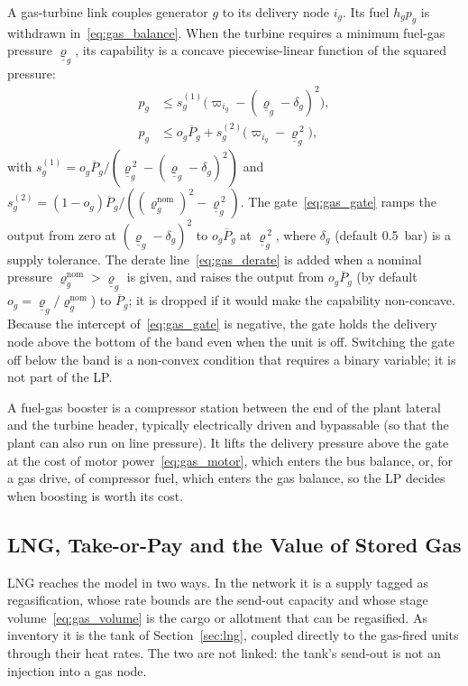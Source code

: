 A gas-turbine link couples generator $g$ to its delivery node $i_g$.
Its fuel $h_g p_g$ is withdrawn in~\eqref{eq:gas_balance}.  When the
turbine requires a minimum fuel-gas pressure $\underline{\varrho}_g$,
its capability is a concave piecewise-linear function of the squared
pressure:
\begin{align}
p_g &\leq s^{(1)}_g\bigl(\varpi_{i_g}
  - (\underline{\varrho}_g - \delta_g)^2\bigr),
  \label{eq:gas_gate} \\
p_g &\leq o_g\overline{P}_g
  + s^{(2)}_g\bigl(\varpi_{i_g} - \underline{\varrho}_g^{\,2}\bigr),
  \label{eq:gas_derate}
\end{align}
with $s^{(1)}_g = o_g\overline{P}_g/(\underline{\varrho}_g^{\,2}
- (\underline{\varrho}_g - \delta_g)^2)$ and
$s^{(2)}_g = (1 - o_g)\overline{P}_g/((\varrho^{\mathrm{nom}}_g)^2
- \underline{\varrho}_g^{\,2})$.  The gate~\eqref{eq:gas_gate} ramps the
output from zero at $(\underline{\varrho}_g - \delta_g)^2$ to
$o_g\overline{P}_g$ at $\underline{\varrho}_g^{\,2}$, where $\delta_g$
(default 0.5~bar) is a supply tolerance.  The derate
line~\eqref{eq:gas_derate} is added when a nominal pressure
$\varrho^{\mathrm{nom}}_g > \underline{\varrho}_g$ is given, and raises
the output from $o_g\overline{P}_g$ (by default
$o_g = \underline{\varrho}_g/\varrho^{\mathrm{nom}}_g$) to
$\overline{P}_g$; it is dropped if it would make the capability
non-concave.  Because the intercept of~\eqref{eq:gas_gate} is negative,
the gate holds the delivery node above the bottom of the band even when
the unit is off.  Switching the gate off below the band is a
non-convex condition that requires a binary variable; it is not part of
the LP.

A fuel-gas booster is a compressor station between the end of the plant
lateral and the turbine header, typically electrically driven and
bypassable (so that the plant can also run on line pressure).  It lifts
the delivery pressure above the gate at the cost of motor
power~\eqref{eq:gas_motor}, which enters the bus balance, or, for a gas
drive, of compressor fuel, which enters the gas balance, so the LP
decides when boosting is worth its cost.

\subsection{LNG, Take-or-Pay and the Value of Stored Gas}
\label{sec:lng_value}

LNG reaches the model in two ways.  In the network it is a supply
tagged as regasification, whose rate bounds are the send-out capacity
and whose stage volume~\eqref{eq:gas_volume} is the cargo or allotment
that can be regasified.  As inventory it is the tank of
Section~\ref{sec:lng}, coupled directly to the gas-fired units through
their heat rates.  The two are not linked: the tank's send-out is not
an injection into a gas node.

